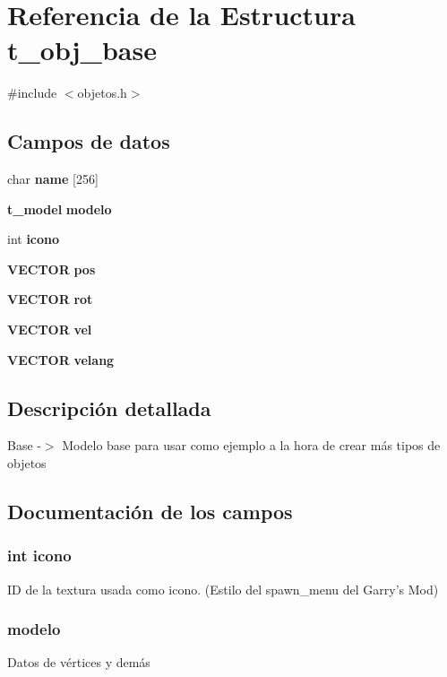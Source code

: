 \section{Referencia de la Estructura t\_\-obj\_\-base}
\label{structt__obj__base}


{\ttfamily \#include $<$objetos.h$>$}\subsection*{Campos de datos}
\begin{DoxyCompactItemize}
\item 
char {\bf name} [256]
\item 
{\bf t\_\-model} {\bf modelo}
\item 
int {\bf icono}
\item 
{\bf VECTOR} {\bf pos}
\item 
{\bf VECTOR} {\bf rot}
\item 
{\bf VECTOR} {\bf vel}
\item 
{\bf VECTOR} {\bf velang}
\end{DoxyCompactItemize}


\subsection{Descripción detallada}
Base -\/$>$ Modelo base para usar como ejemplo a la hora de crear más tipos de objetos 

\subsection{Documentación de los campos}
\subsubsection[{icono}]{\setlength{\rightskip}{0pt plus 5cm}int {\bf icono}}\label{structt__obj__base_adb75f132fa864de961fa8b900dda9c5e}
ID de la textura usada como icono. (Estilo del spawn\_\-menu del Garry's Mod) 
\subsubsection[{modelo}]{ {\bf modelo}}\label{structt__obj__base_a7c3957c02c6d110a204adf63166cdcd6}
Datos de vértices y demás 
